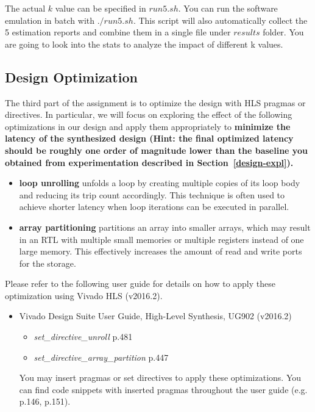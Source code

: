\documentclass[paper=letter, fontsize=10pt]{scrartcl} %
\numberwithin{equation}{section} %
\numberwithin{figure}{section} %
\numberwithin{table}{section} %
\begin{document}
    The actual $k$ value can be specified in $run5.sh$. You can run the software emulation in batch with $./run5.sh$. This script will also automatically collect the 5 estimation reports and combine them in a single file under $results$ folder. You are going to look into the stats to analyze the impact of different k values.
  

\subsection{Design Optimization}
\label{design-opt}
The third part of the assignment is to optimize the design with HLS pragmas or directives. In particular, we will focus on exploring the effect of the following optimizations in our design and apply them appropriately to \textbf{minimize the latency of the synthesized design (Hint: the final optimized latency should be roughly one order of magnitude lower than the baseline you obtained from experimentation described in Section~\ref{design-expl}).} 
\begin{itemize}
\item \textbf{loop unrolling} unfolds a loop by creating multiple copies of its loop body and reducing its trip count accordingly. This technique is often used to achieve shorter latency when loop iterations can be executed in parallel. 
\item \textbf{array partitioning} partitions an array into smaller arrays, which may result in an RTL with multiple small memories or multiple registers instead of one large memory. This effectively increases the amount of read and write ports for the storage.
\end{itemize}

Please refer to the following user guide for details on how to apply these optimization using Vivado HLS (v2016.2). 

\begin{itemize}
\item Vivado Design Suite User Guide, High-Level Synthesis, UG902 (v2016.2)~\cite{ug902}
\begin{itemize}
\item \textit{set\_directive\_unroll} p.481
\item \textit{set\_directive\_array\_partition} p.447
\end{itemize}
You may insert pragmas or set directives to apply these optimizations. You can find code snippets with inserted pragmas throughout the user guide (e.g. p.146, p.151).
\end{itemize}
\end{document}
